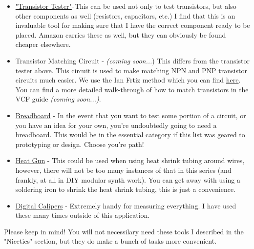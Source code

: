 \documentclass{article}
\begin{document}
\begin{itemize}
	\item \href{https://www.amazon.com/Transistor-DROK-Capacitor-Capacitance-Automatic/dp/B01MS1FOYM/ref=sr_1_1_sspa?dchild=1&keywords=transistor+tester&qid=1596929850&sr=8-1-spons&psc=1&spLa=ZW5jcnlwdGVkUXVhbGlmaWVyPUExQ1k3WThFQURVNUY1JmVuY3J5cHRlZElkPUEwMTAxMDAwSTRCUkg0VTdGVFpTJmVuY3J5cHRlZEFkSWQ9QTA4NTM5NjVHVjI5WEdFMkhFUDAmd2lkZ2V0TmFtZT1zcF9hdGYmYWN0aW9uPWNsaWNrUmVkaXJlY3QmZG9Ob3RMb2dDbGljaz10cnVl}{"Transistor Tester"} - This can be used not only to test transistors, but also other components as well (resistors, capacitors, etc.) I find that this is an invaluable tool for making sure that I have the correct component ready to be placed. Amazon carries these as well, but they can obviously be found cheaper elsewhere.
	\item{Transistor Matching Circuit} - \emph{(coming soon...}) This differs from the transistor tester above. This circuit is used to make matching NPN and PNP transistor circuits much easier. We use the Ian Frtiz method which you can find \href{https://dragonflyalley.com/synth/images/TransistorMatching/ianFritz-transmat0011_144.pdf}{here}. You can find a more detailed walk-through of how to match transistors in the VCF guide \emph{(coming soon...)}.
	\item
	\href{https://www.amazon.com/Breadboard-Solderless-Prototype-PCB-Board/dp/B073XH9GCQ/ref=sr_1_1_sspa?dchild=1&keywords=breadboard&qid=1602427417&sr=8-1-spons&psc=1&spLa=ZW5jcnlwdGVkUXVhbGlmaWVyPUEyRUFRR0pLQTZMMUw3JmVuY3J5cHRlZElkPUEwMzA4NzcwMVBCNTJNVzk5OTExSCZlbmNyeXB0ZWRBZElkPUEwMjQ1ODM4MTdEVVZFSkVFVEk2WSZ3aWRnZXROYW1lPXNwX2F0ZiZhY3Rpb249Y2xpY2tSZWRpcmVjdCZkb05vdExvZ0NsaWNrPXRydWU=}{Breadboard} - In the event that you want to test some portion of a circuit, or you have an idea for your own, you're undoubtedly going to need a breadboard. This would be in the essential category if this list was geared to prototyping or design. Choose you're path!
	\item \href{https://www.amazon.com/Homidic-Handheld-Electric-Portable-Embossing/dp/B07P5WFHJ7/ref=sr_1_2?dchild=1&keywords=heat+gun&qid=1603656328&sr=8-2}{Heat Gun} - This could be used when using heat shrink tubing around wires, however, there will not be too many instances of that in this series (and frankly, at all in DIY modular synth work). You can get away with using a soldering iron to shrink the heat shrink tubing, this is just a convenience.
	\item
	\href{https://www.amazon.com/Digital-Caliper-Adoric-Calipers-Measuring/dp/B07DFFYCXS/ref=sr_1_3?crid=272AJLCMP5OS8&dchild=1&keywords=digital+caliper&qid=1603061959&sprefix=digital+cal%2Caps%2C145&sr=8-3}{Digital Calipers} - Extremely handy for measuring everything. I have used these many times outside of this application.
\end{itemize} 
Please keep in mind! You will not necessilary need these tools I described in the "Niceties" section, but they do make a bunch of tasks more convenient.
\end{document}
